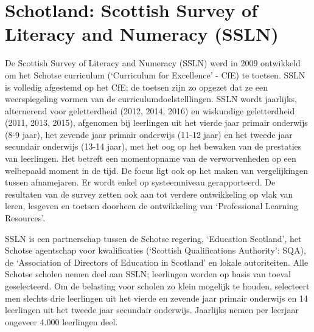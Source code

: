 \documentclass[
  letterpaper,
]{report}
\begin{document}
\hypertarget{schotland-scottish-survey-of-literacy-and-numeracy-ssln}{%
\section{Schotland: Scottish Survey of Literacy and Numeracy
(SSLN)}\label{schotland-scottish-survey-of-literacy-and-numeracy-ssln}}

De Scottish Survey of Literacy and Numeracy (SSLN) werd in 2009
ontwikkeld om het Schotse curriculum (`Curriculum for Excellence' - CfE)
te toetsen. SSLN is volledig afgestemd op het CfE; de toetsen zijn zo
opgezet dat ze een weerspiegeling vormen van de
curriculumdoelstelllingen. SSLN wordt jaarlijks, alternerend voor
geletterdheid (2012, 2014, 2016) en wiskundige geletterdheid (2011,
2013, 2015), afgenomen bij leerlingen uit het vierde jaar primair
onderwijs (8-9 jaar), het zevende jaar primair onderwijs (11-12 jaar) en
het tweede jaar secundair onderwijs (13-14 jaar), met het oog op het
bewaken van de prestaties van leerlingen. Het betreft een momentopname
van de verworvenheden op een welbepaald moment in de tijd. De focus ligt
ook op het maken van vergelijkingen tussen afnamejaren. Er wordt enkel
op systeemniveau gerapporteerd. De resultaten van de survey zetten ook
aan tot verdere ontwikkeling op vlak van leren, lesgeven en toetsen
doorheen de ontwikkeling van `Professional Learning Resources'.

SSLN is een partnerschap tussen de Schotse regering, `Education
Scotland', het Schotse agentschap voor kwalificaties (`Scottish
Qualifications Authority': SQA), de `Association of Directors of
Education in Scotland' en lokale autoriteiten. Alle Schotse scholen
nemen deel aan SSLN; leerlingen worden op basis van toeval geselecteerd.
Om de belasting voor scholen zo klein mogelijk te houden, selecteert men
slechts drie leerlingen uit het vierde en zevende jaar primair onderwijs
en 14 leerlingen uit het tweede jaar secundair onderwijs. Jaarlijks
nemen per leerjaar ongeveer 4.000 leerlingen deel.
\end{document}
